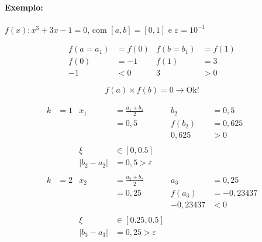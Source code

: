 \documentclass{article}
\begin{document}
        \paragraph{Exemplo:} $f(x) : x^3 + 3x - 1= 0$, com $[a,b] = [0,1]$ e $\varepsilon = 10^{-1}$

        \begin{align*}
            f(a = a_1) &= f(0)  &   f(b = b_1) &= f(1)\\
            f(0) &= -1          &   f(1) &= 3\\
            -1 &< 0             &   3 &> 0
        \end{align*}

        \[f(a) \times f(b) = 0 \rightarrow \text{Ok!}\]

        \begin{align*}
            k &= 1          &           x_1 &= \frac{a_1 + b_1}{2}      &       b_2 &= 0,5\\
            &               &           &= 0,5                          &       f(b_2) &= 0,625\\
            &               &           &                               &       0,625 &> 0\\
            \\
            &               &           \xi &\in [0,0.5]\\
            &               &           |b_2 - a_2| &= 0,5 > \varepsilon\\
            \\
            k &= 2          &           x_2 &= \frac{a_2 + b_2}{2}      &       a_3 &= 0,25\\
            &               &           &= 0,25                         &       f(a_3) &= -0,23437\\
            &               &           &                               &       -0,23437 &< 0\\
            \\
            &               &           \xi &\in [0.25,0.5]\\
            &               &           |b_3 - a_3| &= 0,25 > \varepsilon
        \end{align*}
\end{document}
